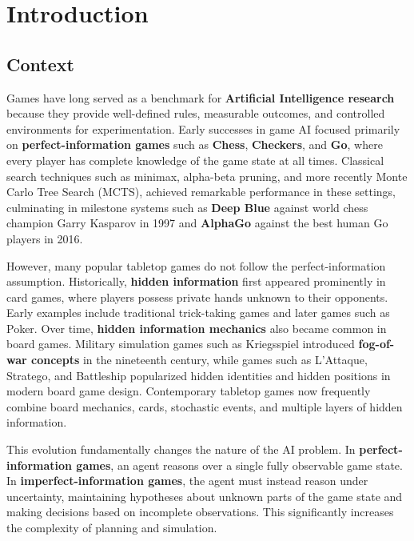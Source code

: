 \chapter{Introduction}
\label{introduction}

\section{Context}
Games have long served as a benchmark for \textbf{Artificial Intelligence research} because they provide well-defined rules, measurable outcomes, and controlled environments for experimentation\cite{yannakakis2025artificial}. Early successes in game AI focused primarily on \textbf{perfect-information games} such as \textbf{Chess}, \textbf{Checkers}, and \textbf{Go}, where every player has complete knowledge of the game state at all times\cite{Newborn2011Kasparov,schaeffer1996chinook,silver2016mastering}. Classical search techniques such as minimax, alpha-beta pruning, and more recently Monte Carlo Tree Search (MCTS), achieved remarkable performance in these settings, culminating in milestone systems such as \textbf{Deep Blue} against world chess champion Garry Kasparov in 1997\cite{Newborn2011Kasparov} and \textbf{AlphaGo} against the best human Go players in 2016\cite{silver2016mastering}.

However, many popular tabletop games do not follow the perfect-information assumption. Historically, \textbf{hidden information} first appeared prominently in card games, where players possess private hands unknown to their opponents. Early examples include traditional trick-taking games and later games such as Poker\cite{bowling2015heads}. Over time, \textbf{hidden information mechanics} also became common in board games. Military simulation games such as Kriegsspiel introduced \textbf{fog-of-war concepts} in the nineteenth century\cite{kirschenbaum2016}, while games such as L'Attaque, Stratego, and Battleship popularized hidden identities and hidden positions in modern board game design\cite{edan1909patent,stratego:boardgame,battleshipgame}. Contemporary tabletop games now frequently combine board mechanics, cards, stochastic events, and multiple layers of hidden information.

This evolution fundamentally changes the nature of the AI problem. In \textbf{perfect-information games}, an agent reasons over a single fully observable game state. In \textbf{imperfect-information games}, the agent must instead reason under uncertainty, maintaining hypotheses about unknown parts of the game state and making decisions based on incomplete observations\cite{russell2020artificial, kaelbling1998planning}. This significantly increases the complexity of planning and simulation.


